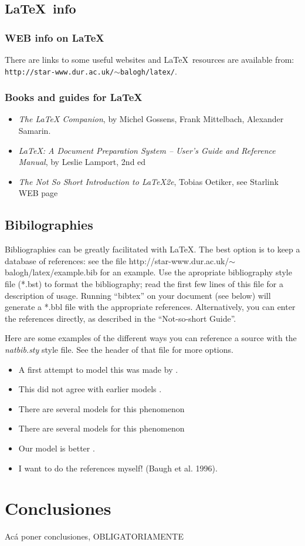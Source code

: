 \documentclass[11pt,a4paper]{emulateapj}
\begin{document}
%
%
\subsection{\LaTeX\, info}\label{sec-webrefs}
%
%
\subsubsection{WEB info on \LaTeX}
There are links to some useful websites and \LaTeX\ resources are available
from: \\ {\tt http://star-www.dur.ac.uk/$\sim$balogh/latex/}.

\subsubsection{Books and guides for \LaTeX}
\begin{itemize}
\item {\it The LaTeX Companion}, by Michel Gossens, Frank Mittelbach, Alexander Samarin.
\item {\it LaTeX: A Document Preparation System -- User's Guide and
    Reference Manual}, by Leslie Lamport, 2nd ed
\item {\it The Not So Short Introduction to LaTeX2e}, Tobias Oetiker,
  see Starlink WEB page
\end{itemize}
\subsection{Bibilographies}

Bibliographies can be greatly facilitated with \LaTeX.  The best option is to keep a database
of references: see the file http://star-www.dur.ac.uk/$\sim$balogh/latex/example.bib for an example.
Use the apropriate bibliography style file (*.bst) to format the bibliography; read the first few
lines of this file for a description of usage.  Running ``bibtex'' on your document (see below)
will generate a *.bbl file with the appropriate references.  Alternatively, you can enter the
references directly, as described in the ``Not-so-short Guide''.  

Here are some examples of the different ways you can reference a source with the
{\it natbib.sty} style file.  See the header of that file for more options.
\begin{itemize}
\item A first attempt to model this was made by \citet{bar96}.
\item This did not agree with earlier models \citep{bar96}.
\item There are several models for this phenomenon \citep{bar96,bau96}
\item There are several models for this phenomenon \citep[e.g., ][]{bar96,bau96,bure96}
\item Our model is better \citep[Fig. 5]{bau96}.
\item I want to do the references myself! (Baugh et al. 1996)\nocite{bau96}.
\end{itemize}


\section{Conclusiones}
Acá poner conclusiones, OBLIGATORIAMENTE
%
%

\end{document}
